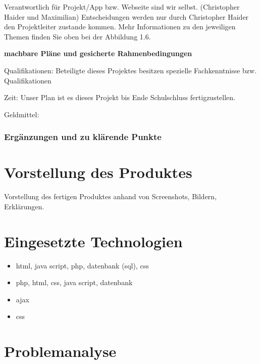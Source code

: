 Verantwortlich für Projekt/App bzw. Webseite sind wir selbst. (Christopher Haider und Maximilian)
Entscheidungen werden nur durch Christopher Haider den Projektleiter zustande kommen.
Mehr Informationen zu den jeweiligen Themen finden Sie oben bei der Abbildung 1.6.


\textbf {machbare Pläne und gesicherte Rahmenbedingungen}

Qualifikationen: Beteiligte dieses Projektes besitzen spezielle Fachkenntnisse bzw. Qualifikationen

Zeit: Unser Plan ist es dieses Projekt bis Ende Schulschluss fertigzustellen.

Geldmittel: 


\subsection{Ergänzungen und zu klärende Punkte}


\chapter{Vorstellung des Produktes}
Vorstellung des fertigen Produktes anhand von Screenshots, Bildern, Erklärungen.

\chapter{Eingesetzte Technologien}
\begin{itemize}
	\item html, java script, php, datenbank (sql), css
	\item php, html, css, java script, datenbank
	\item ajax
	\item css
\end{itemize}

\chapter{Problemanalyse}
